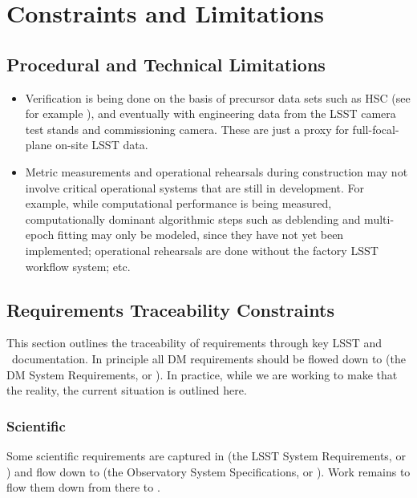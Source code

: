 \section{Constraints and Limitations}

\subsection{Procedural and Technical Limitations}

\begin{itemize}

\item Verification is being done on the basis of precursor data sets such as HSC (see for example ), and eventually with engineering data from the LSST camera test stands and commissioning camera. These are just a proxy for full-focal-plane on-site LSST data.

\item Metric measurements and operational rehearsals during construction may not involve critical operational systems that are still in development. For example, while computational performance is being measured, computationally dominant algorithmic steps such as deblending and multi-epoch fitting may only be modeled, since they have not yet been implemented; operational rehearsals are done without the factory LSST workflow system; etc.

\end{itemize}

\subsection{Requirements Traceability Constraints}

This section outlines the traceability of requirements through key LSST and \product\ documentation.
In principle all DM requirements should be flowed down to  (the DM System Requirements, or \DMSR).
In practice, while we are working to make that the reality, the current situation is outlined here.

\subsubsection{Scientific}

Some scientific requirements are captured in  (the LSST System Requirements, or \LSR) and flow down to  (the Observatory System Specifications, or \OSS).
Work remains to flow them down from there to .

